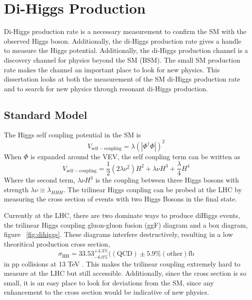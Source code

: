 \chapter{Di-Higgs Production}
Di-Higgs production rate is a necessary measurement to confirm the SM with the observed Higgs boson. Additionally, the di-Higgs production rate gives a handle to measure the Higgs potential. Additionally, the di-Higgs production channel is a discovery channel for physics beyond the SM (BSM). The small SM production rate makes the channel an important place to look for new physics. This dissertation looks at both the measurement of the SM di-Higgs production rate and to search for new physics through resonant di-Higgs production. 
\section{Standard Model}
The Higgs self coupling potential in the SM is
\begin{equation}
V_{\mathrm{self-coupling}} = \lambda(|\Phi^{\dagger}\Phi|)^{2}
\end{equation}
When ${\Phi}$ is expanded around the VEV, the self coupling term can be written as
\begin{equation}
V_{\mathrm{self-coupling}} = \frac{1}{2}(2\lambda\nu^{2})H^{2} + \lambda\nu H^{3} + \frac{\lambda}{4}H^{4}
\end{equation}
Where the second term, ${\lambda\nu H^{3}}$ is the coupling between three Higgs bosons with strength ${\lambda\nu \equiv \lambda_{HHH}}$\cite{Belusevic:2004pz}. The trilinear Higgs coupling can be probed at the LHC by measuring the cross section of events with two Higgs Bosons in the final state.\newline



\indent  Currently at the LHC, there are two dominate ways to produce diHiggs events, the trilinear Higgs coupling gluon-gluon fusion (ggF) diagram and a box diagram, figure ~\ref{fig:dihiggs}. These diagrams interfere destructively, resulting in a low theoritical production cross section, 
\begin{equation}
\sigma_{\mathrm{HH}} = 33.53^{+4.3\%}_{-6.0\%} (\mathrm{(QCD)}\pm{5.9\%} \mathrm{(other)} \mathrm{fb}
\end{equation}
in pp collisions at 13 TeV \cite{Sirunyan:2018two}. This makes the trilinear coupling extremely hard to measure at the LHC but still accessible. Additionally, since the cross section is so small, it is an easy place to look for deviations from the SM, since any enhancement to the cross section would be indicative of new physics.

